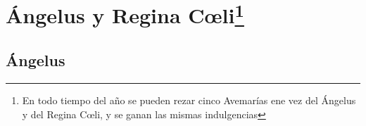\documentclass[10pt,twoside]{book}
\begin{document}

\chapter*{Ángelus y Regina C{\oe}li\footnote{En todo tiempo del año se pueden rezar cinco Avemarías ene vez del Ángelus y del Regina C{\oe}li,
y se ganan las mismas indulgencias}}

\section*{Ángelus}
\begin{paracol}{2}
      \begin{leftcolumn}
            
      \end{leftcolumn}
      \begin{otherlanguage}{latin}
            \begin{rightcolumn}
                  
            \end{rightcolumn}
      \end{otherlanguage}


      \begin{leftcolumn*}
            
      \end{leftcolumn*}
      \begin{otherlanguage}{latin}
            \begin{rightcolumn}
                  
            \end{rightcolumn}
      \end{otherlanguage}

      \begin{leftcolumn*}
            
      \end{leftcolumn*}
      \begin{otherlanguage}{latin}
            \begin{rightcolumn}
                  
            \end{rightcolumn}
      \end{otherlanguage}


\end{paracol}
\end{document}
